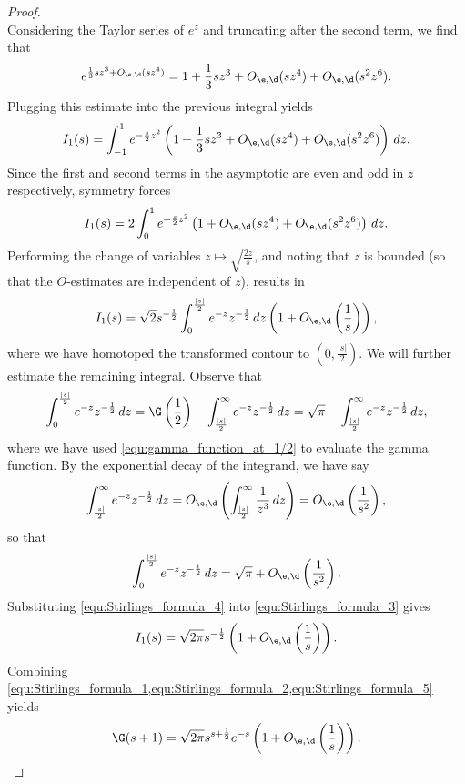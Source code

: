 \begin{proof}
\[    \]
      Considering the Taylor series of \(e^{z}\) and truncating after the second term, we find that
    \[
      e^{\frac{1}{3}sz^{3}+O_{\e,\d}(sz^{4})} = 1+\frac{1}{3}sz^{3}+O_{\e,\d}(sz^{4})+O_{\e,\d}(s^{2}z^{6}).
    \]
    Plugging this estimate into the previous integral yields
    \[
      I_{1}(s) = \int_{-1}^{1}e^{-\frac{s}{2}z^{2}}\left(1+\frac{1}{3}sz^{3}+O_{\e,\d}(sz^{4})+O_{\e,\d}(s^{2}z^{6})\right)\,dz.
    \]
    Since the first and second terms in the asymptotic are even and odd in \(z\) respectively, symmetry forces
    \[
      I_{1}(s) = 2\int_{0}^{1}e^{-\frac{s}{2}z^{2}}\left(1+O_{\e,\d}(sz^{4})+O_{\e,\d}(s^{2}z^{6})\right)\,dz.
    \]
    Performing the change of variables \(z \mapsto \sqrt{\frac{2z}{s}}\), and noting that \(z\) is bounded (so that the \(O\)-estimates are independent of \(z\)), results in
    \begin{equation}\label{equ:Stirlings_formula_3}
      I_{1}(s) = \sqrt{2}s^{-\frac{1}{2}}\int_{0}^{\frac{|s|}{2}}e^{-z}z^{-\frac{1}{2}}\,dz\left(1+O_{\e,\d}\left(\frac{1}{s}\right)\right),
    \end{equation}
    where we have homotoped the transformed contour to \(\left(0,\frac{|s|}{2}\right)\). We will further estimate the remaining integral. Observe that
    \[
      \int_{0}^{\frac{|s|}{2}}e^{-z}z^{-\frac{1}{2}}\,dz = \G\left(\frac{1}{2}\right)-\int_{\frac{|s|}{2}}^{\infty}e^{-z}z^{-\frac{1}{2}}\,dz = \sqrt{\pi}-\int_{\frac{|s|}{2}}^{\infty}e^{-z}z^{-\frac{1}{2}}\,dz,
    \]
    where we have used \cref{equ:gamma_function_at_1/2} to evaluate the gamma function. By the exponential decay of the integrand, we have say
    \[
      \int_{\frac{|s|}{2}}^{\infty}e^{-z}z^{-\frac{1}{2}}\,dz = O_{\e,\d}\left(\int_{\frac{|s|}{2}}^{\infty}\frac{1}{z^{3}}\,dz\right) = O_{\e,\d}\left(\frac{1}{s^{2}}\right),
    \]
    so that 
    \begin{equation}\label{equ:Stirlings_formula_4}
      \int_{0}^{\frac{|s|}{2}}e^{-z}z^{-\frac{1}{2}}\,dz = \sqrt{\pi}+O_{\e,\d}\left(\frac{1}{s^{2}}\right).
    \end{equation}
    Substituting \cref{equ:Stirlings_formula_4} into \cref{equ:Stirlings_formula_3} gives
    \begin{equation}\label{equ:Stirlings_formula_5}
      I_{1}(s) = \sqrt{2\pi}s^{-\frac{1}{2}}\left(1+O_{\e,\d}\left(\frac{1}{s}\right)\right).
    \end{equation}
    Combining \cref{equ:Stirlings_formula_1,equ:Stirlings_formula_2,equ:Stirlings_formula_5} yields
    \[
      \G(s+1) = \sqrt{2\pi}s^{s+\frac{1}{2}}e^{-s}\left(1+O_{\e,\d}\left(\frac{1}{s}\right)\right).
\]
\end{proof}
